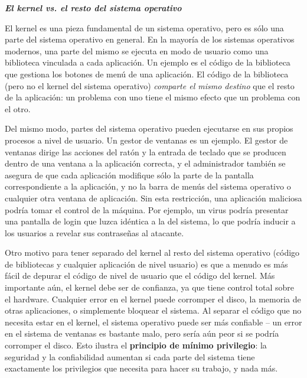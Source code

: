 \documentclass[10pt]{book}
\begin{document}
\vspace{0.5cm}
\textit{\textbf{El kernel vs. el resto del sistema operativo}}

El kernel es una pieza fundamental de un sistema operativo, pero es sólo una parte del sistema operativo en general. En la mayoría de los sistemas operativos modernos, una parte del mismo se ejecuta en modo de usuario como una biblioteca vinculada a cada aplicación. Un ejemplo es el código de la biblioteca que gestiona los botones de menú de una aplicación. El código de la biblioteca (pero no el kernel del sistema operativo) \textit{comparte el mismo destino} que el resto de la aplicación: un problema con uno tiene el mismo efecto que un problema con el otro.

Del mismo modo, partes del sistema operativo pueden ejecutarse en sus propios procesos a nivel de usuario. Un gestor de ventanas es un ejemplo. El gestor de ventanas dirige las acciones del ratón y la entrada de teclado que se producen dentro de una ventana a la aplicación correcta, y el administrador también se asegura de que cada aplicación modifique sólo la parte de la pantalla correspondiente a la aplicación, y no la barra de menús del sistema operativo o cualquier otra ventana de aplicación. Sin esta restricción, una aplicación maliciosa podría tomar el control de la máquina. Por ejemplo, un virus podría presentar una pantalla de login que luzca idéntica a la del sistema, lo que podría inducir a los usuarios a revelar sus contraseñas al atacante.

Otro motivo para tener separado del kernel al resto del sistema operativo (código de bibliotecas y cualquier aplicación de nivel usuario) es que a menudo es más fácil de depurar el código de nivel de usuario que el código del kernel. Más importante aún, el kernel debe ser de confianza, ya que tiene control total sobre el hardware. Cualquier error en el kernel puede corromper el disco, la memoria de otras aplicaciones, o simplemente bloquear el sistema. Al separar el código que no necesita estar en el kernel, el sistema operativo puede ser más confiable -- un error en el sistema de ventanas es bastante malo, pero sería aún peor si se podría corromper el disco. Esto ilustra el \textbf{principio de mínimo privilegio}: la seguridad y la confiabilidad aumentan si cada parte del sistema tiene exactamente los privilegios que necesita para hacer su trabajo, y nada más.
\end{document}
